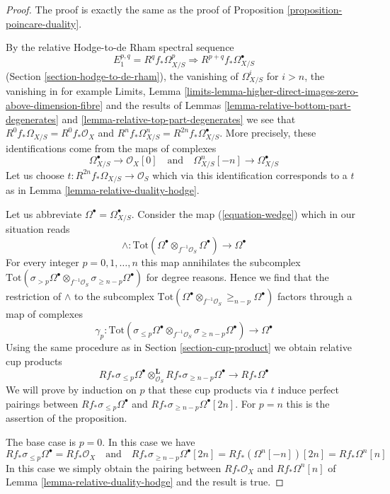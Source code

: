 \begin{proof}
The proof is exactly the same as the proof of
Proposition \ref{proposition-poincare-duality}.

\medskip\noindent
By the relative Hodge-to-de Rham spectral sequence
$$
E_1^{p, q} = R^qf_*\Omega^p_{X/S} \Rightarrow R^{p + q}f_*\Omega^\bullet_{X/S}
$$
(Section \ref{section-hodge-to-de-rham}), the vanishing
of $\Omega^i_{X/S}$ for $i > n$, the vanishing in for example Limits, Lemma
\ref{limits-lemma-higher-direct-images-zero-above-dimension-fibre}
and the results of Lemmas \ref{lemma-relative-bottom-part-degenerates} and
\ref{lemma-relative-top-part-degenerates}
we see that $R^0f_*\Omega_{X/S} = R^0f_*\mathcal{O}_X$
and $R^nf_*\Omega^n_{X/S} = R^{2n}f_*\Omega^\bullet_{X/S}$.
More precisely, these identifications come from the maps
of complexes
$$
\Omega^\bullet_{X/S} \to \mathcal{O}_X[0]
\quad\text{and}\quad
\Omega^n_{X/S}[-n] \to \Omega^\bullet_{X/S}
$$
Let us choose $t : R^{2n}f_*\Omega_{X/S} \to \mathcal{O}_S$
which via this identification corresponds to a $t$ as in
Lemma \ref{lemma-relative-duality-hodge}.

\medskip\noindent
Let us abbreviate $\Omega^\bullet = \Omega^\bullet_{X/S}$.
Consider the map (\ref{equation-wedge}) which in our situation reads
$$
\wedge :
\text{Tot}(\Omega^\bullet \otimes_{f^{-1}\mathcal{O}_S} \Omega^\bullet)
\longrightarrow
\Omega^\bullet
$$
For every integer $p = 0, 1, \ldots, n$ this map annihilates the subcomplex
$\text{Tot}(\sigma_{> p} \Omega^\bullet \otimes_{f^{-1}\mathcal{O}_S}
\sigma_{\geq n - p} \Omega^\bullet)$ for degree reasons.
Hence we find that the restriction of $\wedge$ to the subcomplex
$\text{Tot}(\Omega^\bullet \otimes_{f^{-1}\mathcal{O}_S}
\geq_{n - p}\Omega^\bullet)$ factors through a map of complexes
$$
\gamma_p :
\text{Tot}(\sigma_{\leq p} \Omega^\bullet \otimes_{f^{-1}\mathcal{O}_S}
\sigma_{\geq n - p} \Omega^\bullet)
\longrightarrow
\Omega^\bullet
$$
Using the same procedure as in Section \ref{section-cup-product} we obtain
relative cup products
$$
Rf_*\sigma_{\leq p} \Omega^\bullet
\otimes_{\mathcal{O}_S}^\mathbf{L}
Rf_*\sigma_{\geq n - p}\Omega^\bullet
\longrightarrow
Rf_*\Omega^\bullet
$$
We will prove by induction on $p$ that these cup products via $t$
induce perfect pairings between $Rf_*\sigma_{\leq p} \Omega^\bullet$
and $Rf_*\sigma_{\geq n - p}\Omega^\bullet[2n]$. For $p = n$
this is the assertion of the proposition.

\medskip\noindent
The base case is $p = 0$. In this case we have
$$
Rf_*\sigma_{\leq p}\Omega^\bullet = Rf_*\mathcal{O}_X
\quad\text{and}\quad
Rf_*\sigma_{\geq n - p}\Omega^\bullet[2n] = Rf_*(\Omega^n[-n])[2n] =
Rf_*\Omega^n[n]
$$
In this case we simply obtain the pairing
between $Rf_*\mathcal{O}_X$ and $Rf_*\Omega^n[n]$ of
Lemma \ref{lemma-relative-duality-hodge} and the result is true.


\end{proof}
